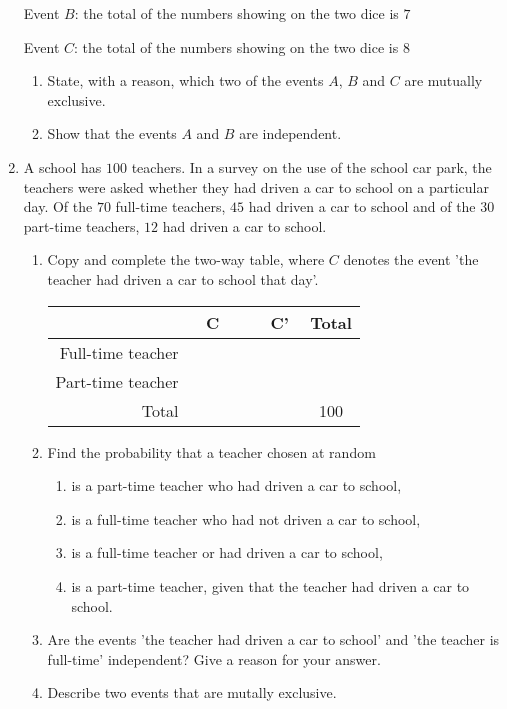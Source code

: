 \begin{enumerate}
Event $B$: the total of the numbers showing on the two dice is $7$

Event $C$: the total of the numbers showing on the two dice is $8$

\begin{enumerate}
	\item State, with a reason, which two of the events $A$, $B$ and $C$ are mutually exclusive.
	\item Show that the events $A$ and $B$ are independent.
\end{enumerate}




\item A school has $100$ teachers. In a survey on the use of the school car park, the teachers were asked 	whether they had driven a car to school on a particular day. Of the $70$ full-time teachers, 	$45$ had driven a car to  school and of the $30$ part-time teachers, $12$ had driven a car to school.

\begin{enumerate}
	\item Copy and complete the two-way table, where $C$ denotes the event 'the teacher had driven  a car to school that day'.
	
	\begin{table}[!htpb]
		\centering
		\begin{tabular}{r|c|c|c}
			\cline{2-3}
			& \, \,C \, \, & \, \, C'\,\, & Total                    \\ \hline
			\multicolumn{1}{|r|}{Full-time teacher} &   &    & \multicolumn{1}{c|}{}    \\ \hline
			\multicolumn{1}{|r|}{Part-time teacher} &   &    & \multicolumn{1}{c|}{}    \\ \hline
			Total                                   &   &    & \multicolumn{1}{c|}{100} \\ \cline{2-4} 
		\end{tabular}
	\end{table}
	
	\item Find the probability that a teacher chosen at random
	\begin{enumerate}
		\item is a part-time teacher who had driven a car to school,
		\item is a full-time teacher who had not driven a car to school,
		\item is a full-time teacher or had driven 	a car to school,
		\item is a part-time teacher, given that the teacher had driven a car to school.
	\end{enumerate}

\item Are the events 'the teacher had driven a car to school' and 'the teacher is full-time' independent? Give a reason for your answer.
\item Describe two events that are mutally exclusive.    
	
	
\end{enumerate}
 


\end{enumerate}

